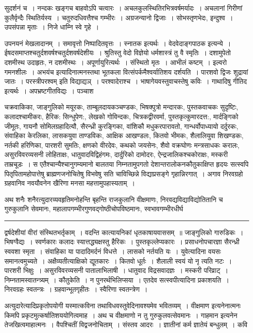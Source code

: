 \documentclass[11pt, openany]{book}
\begin{document}
\noindent
{\s सुदर्शनं च~। नन्दकः खङ्गच बाहवोऽपि चत्वारः~। अचलकुलस्थितिरभित्रवर्षमर्यादः~। अचलानां गिरीणां कुलैर्वृन्दैः स्थितिर्यस्य~। चतुरुदधिवत्तैश्च गम्भीरः~। अग्रजन्यानो द्विजाः~। सोभस्तृणभेदः, इन्दुश्व~। उपसंपन्ना मृताः~। निजे धाम्नि स्वे गृहे~।

उपनयनं मेखलादानम्~। समावृत्तो निष्पादितवृत्तः~। स्नातक इत्यर्थः~। वेदवेदाङ्गपाठक इत्यन्ये~। ईषदसमाप्तश्चतुर्दशवर्षश्चतुर्दशवर्षदेशीयः~। {\qt श्रुतिस्तु वेदो विज्ञेयो धर्मशास्त्रं तु वै स्मृतिः}~। दशामुपेतो दशमीस्थ उदाहृतः, न दशमीस्थः~। अपूर्णायुरित्यर्थः~। संस्थितो मृतः~। आभीलं कष्टम्~। इल्वरो गमनशीलः~। {\qt अभयंच} इत्यादिनात्मनस्तथा भूतकला वित्संपर्कमैश्वर्यातिशय दर्शयति~। पारशवो द्विजः शुद्रायां जातः~। {\qt परस्त्रीपरश्वम्} इति विद्याद्यञ्~। परश्वादेराश्च~। भाषागेयवस्तुवाचस्तेषु कविः~। गाथादिषु गीतिद इत्यर्थः~। अपभ्रष्टगीतविद्यः~। पञ्चाश\textendash}

\newpage

\noindent
चक्रवाकिका, जाङ्गुलिको मयूरकः, ताम्बूलदायकञ्चण्डकः, भिषक्पुत्रो मन्दारकः, पुस्तकवाचकः सुदृष्टिः, कलादश्चामीकरः, हैरिक: सिन्धुपेण:, लेखको गोविन्दकः, चित्रकद्वीरवर्मा, पुस्तकृत्कुमारदत्त:, मार्दङ्गिको जीमूतः, गायनौ सोमिलग्रहादित्यौ, सैरन्ध्री कुरङ्गिका, वांशिकौ मधुकरपारावतो, गान्धर्वोपाध्यायो दर्दुरकः, संवाहिका केरलिका, लासकयुवा ताण्डविकः, आक्षिक आखण्डलः, कितवो भीमकः, शैलालियुवा शिखण्डकः, नर्तकी हरिणिका, पारशरी सुमतिः, क्षणको वीरदेवः, कथको जयसेनः, शैवो वक्रघोणः मन्त्रसाधकः करालः, असुरविवरव्यसनी लोहिताक्षः, धातुवादविद्विहंगमः, दार्दुरिको दामोदरः, ऐन्द्रजालिकश्चकोराक्षः, मस्करी ताम्रचूडः~। स एतैश्चान्यैश्चानुगम्यमानो बालतया निम्नतामुपगतो देशान्तरालोकनकौतुकाक्षिप्त हृदयः सत्स्वपि पितृपितामहोपात्तेषु ब्राह्मणजनोचितेषु विभवेषु सति चाविच्छिन्ने विद्याप्रसङ्गे गृहान्निरगात्~। अगाव निरवग्रहो ग्रहवानिव नवयौवनेन खैरिणा मनसा महत्तामुपहास्यताम्~।

अथ शनैः शनैरत्युदारव्यवहृतिमनोहन्ति बृहन्ति राजकुलानि वीक्षमाणः, निरवद्यविद्याविद्योतितानि च गुरुकुलानि सेवमानः, महालापगम्भीरगुणवद्गोष्ठीचोपविष्ठमानः, स्वभावगम्भीरधीर्घ\textendash

\vspace{2mm}
\hrule

\noindent
{\s द्वर्षदेशीयां वीरां संस्थितभर्तृकाम्~। वदन्ति कात्यायनिकां धृतकाषायवाससम्~॥ जाङ्गुलिको गारुडिकः~। भिषग्वैद्यः~। {\qt स्वर्णकारः कलादः स्यात्तद्ध्यक्षस्तु हैरिकः}~। पुस्तकृल्लेप्यकारः~। {\qt प्रसाधनोपचारज्ञा सैरन्ध्री स्ववशा स्मृता}~। संवाहिका या पादादिमर्दनं विधत्ते~। लासको नर्तयति यः~। युवेत्यादिना वयसः समानत्वमुच्यते~। अक्षैव्यतीत्याक्षिको द्यूतकारः~। कितवो धूर्तः~। शैलाली स्वयं यो नृ त्यति नटः~। पारशरी भिक्षुः~। असुरविवरव्यसनी पातालाभिलाषी~। धातुवाद विद्रसवादज्ञः~। मस्करी परिव्राट्~। निम्नतामस्वातन्त्र्यम्~। {\qtt कौतुकेति}~। न पुनरर्थभिलिप्सया~। एतदेव सत्स्वपीत्यादिना प्रकाशयति~। निरवग्रहः स्वतन्त्रः~। ग्रहवान्भूतगृहीतः~। स्वैरिणा स्वतन्त्रेण~।

अत्युदारेत्यादिप्रकृतोपयोगी यस्मात्कविना तथाविधवस्तुवेदिनावश्यमेव भवितव्यम्~। वीक्षमाण इत्यनेनात्मनः किमपि प्रकृटमुत्कर्षातिशययोगित्वमाह~। अथ च वीक्षमाणो न तु गुरुकुलवत्सेवमानः~। गाहमान इत्यनेन तेजखित्वमाहात्मनः~। वैपश्चितीं विद्वजनोचिताम्~। संस्तव आदरः~। ज्ञातीनां कर्म ज्ञातेयं बन्धुलम्~। कवि\textendash}
\end{document}
